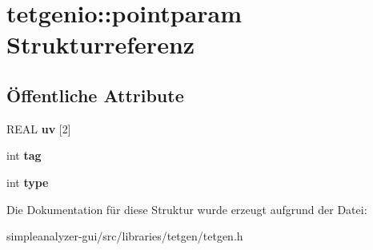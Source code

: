 \hypertarget{structtetgenio_1_1pointparam}{\section{tetgenio\-:\-:pointparam Strukturreferenz}
\label{structtetgenio_1_1pointparam}
}
\subsection*{Öffentliche Attribute}
\begin{DoxyCompactItemize}
\item 
\hypertarget{structtetgenio_1_1pointparam_a043a61660f4b9f0e164c91692fdb0ee5}{R\-E\-A\-L {\bfseries uv} \mbox{[}2\mbox{]}}\label{structtetgenio_1_1pointparam_a043a61660f4b9f0e164c91692fdb0ee5}

\item 
\hypertarget{structtetgenio_1_1pointparam_aa7ad61c79f963c3d198d5f48f5501f52}{int {\bfseries tag}}\label{structtetgenio_1_1pointparam_aa7ad61c79f963c3d198d5f48f5501f52}

\item 
\hypertarget{structtetgenio_1_1pointparam_a172c5af02af4fe6ab385df812c1ea1ff}{int {\bfseries type}}\label{structtetgenio_1_1pointparam_a172c5af02af4fe6ab385df812c1ea1ff}

\end{DoxyCompactItemize}


Die Dokumentation für diese Struktur wurde erzeugt aufgrund der Datei\-:\begin{DoxyCompactItemize}
\item 
simpleanalyzer-\/gui/src/libraries/tetgen/tetgen.\-h\end{DoxyCompactItemize}

